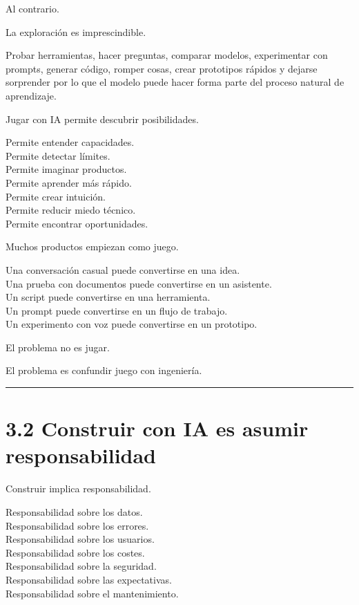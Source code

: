 Al contrario.

La exploración es imprescindible.

Probar herramientas, hacer preguntas, comparar modelos, experimentar con
prompts, generar código, romper cosas, crear prototipos rápidos y
dejarse sorprender por lo que el modelo puede hacer forma parte del
proceso natural de aprendizaje.

Jugar con IA permite descubrir posibilidades.

Permite entender capacidades.\\
Permite detectar límites.\\
Permite imaginar productos.\\
Permite aprender más rápido.\\
Permite crear intuición.\\
Permite reducir miedo técnico.\\
Permite encontrar oportunidades.

Muchos productos empiezan como juego.

Una conversación casual puede convertirse en una idea.\\
Una prueba con documentos puede convertirse en un asistente.\\
Un script puede convertirse en una herramienta.\\
Un prompt puede convertirse en un flujo de trabajo.\\
Un experimento con voz puede convertirse en un prototipo.

El problema no es jugar.

El problema es confundir juego con ingeniería.

\begin{center}\rule{0.5\linewidth}{0.5pt}\end{center}

\section{3.2 Construir con IA es asumir
responsabilidad}\label{construir-con-ia-es-asumir-responsabilidad}

Construir implica responsabilidad.

Responsabilidad sobre los datos.\\
Responsabilidad sobre los errores.\\
Responsabilidad sobre los usuarios.\\
Responsabilidad sobre los costes.\\
Responsabilidad sobre la seguridad.\\
Responsabilidad sobre las expectativas.\\
Responsabilidad sobre el mantenimiento.

